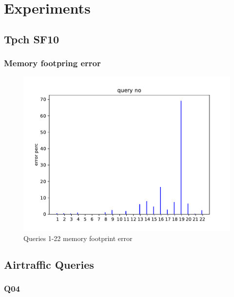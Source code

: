 \section{Experiments}
\subsection{Tpch SF10}
\subsubsection{Memory footpring error}
\begin{figure}[ht]
  \centering
  \includegraphics[scale=0.7]{figs/tpch10/mem_error_1-23.pdf}
  \caption{Queries 1-22 memory footprint error}
  \label{fig:tpch10m}
\end{figure}

%
%

\subsection{Airtraffic Queries}
\subsubsection{Q04}

